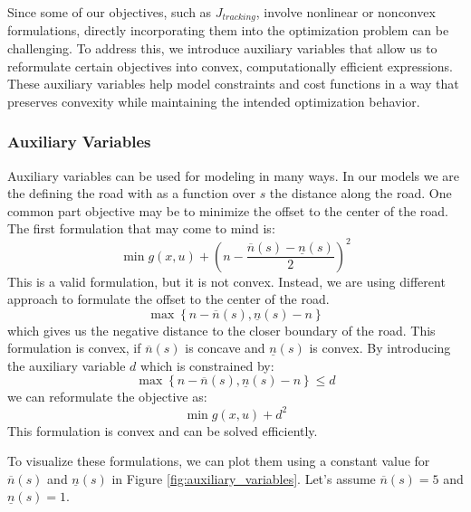 Since some of our objectives, such as $J_{tracking}$, involve nonlinear or nonconvex formulations, directly incorporating them into the optimization
problem can be challenging.
To address this, we introduce auxiliary variables that allow us to reformulate certain objectives into convex, computationally efficient expressions.
These auxiliary variables help model constraints and cost functions in a way that preserves convexity while maintaining the intended optimization
behavior.

\subsubsection{Auxiliary Variables}

Auxiliary variables can be used for modeling in many ways.
In our models we are the defining the road with as a function over $s$ the distance along the road.
One common part objective may be to minimize the offset to the center of the road.
The first formulation that may come to mind is: \[ \min g(x, u) + \left( n - \frac{\overline{n}(s) - \underline{n}(s)}{2} \right)^2 \] This is a
valid formulation, but it is not convex.
Instead, we are using different approach to formulate the offset to the center of the road.
\[
	\max \left\{ n - \overline{n}(s),  \underline{n}(s) - n \right\}
\]
which gives us the negative distance to the closer boundary of the road.
This formulation is convex, if $\overline{n}(s)$ is concave and $\underline{n}(s)$ is convex.
By introducing the auxiliary variable $d$ which is constrained by: \[ \max \left\{ n - \overline{n}(s), \underline{n}(s) - n \right\} \leq d \] we
can reformulate the objective as: \[ \min g(x, u) + d^2 \] This formulation is convex and can be solved efficiently.

To visualize these formulations, we can plot them using a constant value for \(\overline{n}(s)\) and \(\underline{n}(s)\) in Figure
\ref{fig:auxiliary_variables}.
Let's assume \(\overline{n}(s) = 5\) and \(\underline{n}(s) = 1\).

